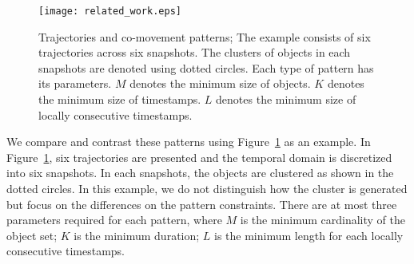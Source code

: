 % 
\begin{figure}[h]
\centering
\texttt{[image: related\_work.eps]}
\caption{Trajectories and co-movement patterns; The example consists of six trajectories across six snapshots. The
clusters of objects in each snapshots are denoted using dotted circles. Each type of pattern has its parameters. 
$M$ denotes the minimum size of objects.
$K$ denotes the minimum size of timestamps.
$L$ denotes the minimum size of locally consecutive timestamps.}
\label{fig:related_work}
\end{figure}


We compare and contrast these patterns using Figure~\ref{fig:related_work} as an example. 
In Figure~\ref{fig:related_work}, six trajectories are presented and 
the temporal domain is discretized into six snapshots. In each snapshots,
the objects are clustered as shown in the dotted circles. In this example, we
do not distinguish how the cluster is generated but focus on the 
differences on the pattern constraints. There are at most three parameters
required for each pattern, where $M$ is the minimum cardinality  of the object set;
$K$ is the minimum duration; $L$ is the minimum length for each locally consecutive
timestamps.

